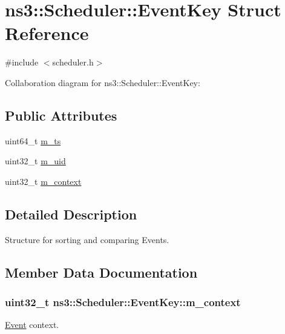 \hypertarget{structns3_1_1Scheduler_1_1EventKey}{}\section{ns3\+:\+:Scheduler\+:\+:Event\+Key Struct Reference}
\label{structns3_1_1Scheduler_1_1EventKey}


{\ttfamily \#include $<$scheduler.\+h$>$}



Collaboration diagram for ns3\+:\+:Scheduler\+:\+:Event\+Key\+:
\subsection*{Public Attributes}
\begin{DoxyCompactItemize}
\item 
uint64\+\_\+t \hyperlink{structns3_1_1Scheduler_1_1EventKey_a5ba9eda880f52483aeead131810d0fcf}{m\+\_\+ts}
\item 
uint32\+\_\+t \hyperlink{structns3_1_1Scheduler_1_1EventKey_aae8993764a7814eae2e89e709d36444c}{m\+\_\+uid}
\item 
uint32\+\_\+t \hyperlink{structns3_1_1Scheduler_1_1EventKey_a4756669d97b144a6f86c1c4c6cbd9eea}{m\+\_\+context}
\end{DoxyCompactItemize}


\subsection{Detailed Description}
Structure for sorting and comparing Events. 

\subsection{Member Data Documentation}
\subsubsection[{\texorpdfstring{m\+\_\+context}{m_context}}]{\setlength{\rightskip}{0pt plus 5cm}uint32\+\_\+t ns3\+::\+Scheduler\+::\+Event\+Key\+::m\+\_\+context}\hypertarget{structns3_1_1Scheduler_1_1EventKey_a4756669d97b144a6f86c1c4c6cbd9eea}{}\label{structns3_1_1Scheduler_1_1EventKey_a4756669d97b144a6f86c1c4c6cbd9eea}
\hyperlink{structns3_1_1Scheduler_1_1Event}{Event} context. 
